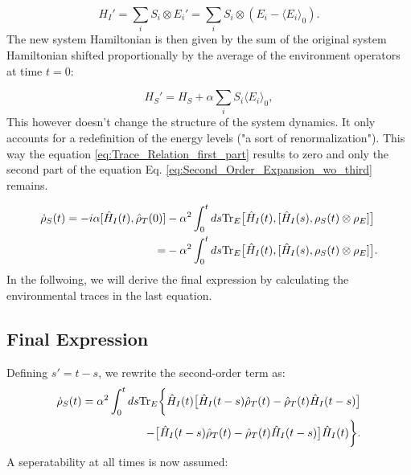 \begin{equation}
	H_I' = \sum_i S_i \otimes E_i' = \sum_i S_i \otimes (E_i - \langle E_i \rangle_0).
	\label{eq:Shifted_Interaction_Hamiltonian}
\end{equation}
The new system Hamiltonian is then given by the sum of the original system Hamiltonian shifted proportionally by the average of the environment operators at time $t = 0$:

\begin{equation}
	H_S' = H_S + \alpha \sum_i S_i \langle E_i \rangle_0,
	\label{eq:Shifted_System_Hamiltonian}
\end{equation}
This however doesn't change the structure of the system dynamics.
It only accounts for a redefinition of the energy levels ("a sort of renormalization").
This way the equation \eqref{eq:Trace_Relation_first_part} results to zero and only the second part of the equation Eq. \eqref{eq:Second_Order_Expansion_wo_third} remains.

\begin{align}
	\dot{\rho}_S(t) = -i \alpha [\hat{H}_I(t),\hat{\rho}_T(0)]
	  & - \alpha^2 \int_0^t ds \mathrm{Tr}_E \big[\hat{H}_I(t), [\hat{H}_I(s), \rho_S(t) \otimes \rho_E]\big] \notag \\
	= & - \alpha^2 \int_0^t ds \mathrm{Tr}_E \big[\hat{H}_I(t), [\hat{H}_I(s), \rho_S(t) \otimes \rho_E]\big].
	\label{eq:Partial_Trace_Derivation}
\end{align}
In the follwoing, we will derive the final expression by calculating the environmental traces in the last equation.


\subsection{Final Expression}
\label{subsec:Final_Expression}

Defining $s' = t - s$, we rewrite the second-order term as:
\begin{align}
	\dot{\rho}_S(t)  = \alpha^2 \int_0^t ds \mathrm{Tr}_E \bigg\{
	\hat{H}_I(t) \big[ \hat{H}_I(t-s) \hat{\rho}_T(t) - \hat{\rho}_T(t) \hat{H}_I(t-s) \big] \notag \\
	- \big[ \hat{H}_I(t-s) \hat{\rho}_T(t) - \hat{\rho}_T(t) \hat{H}_I(t-s) \big] \hat{H}_I(t)
	\bigg\}.
	\label{eq:Second_Order_Final_Expression}
\end{align}
A seperatability at all times is now assumed:

